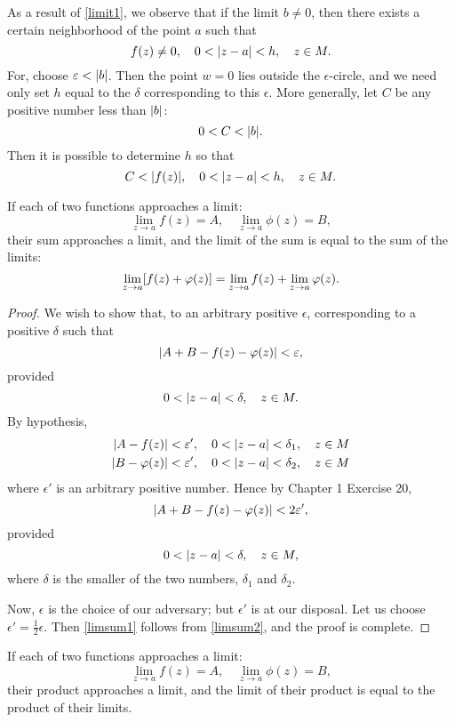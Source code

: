 \documentclass[twosided]{memoir}
\begin{document}
As a result of \ref{limit1}, we observe that if the limit $b\neq 0$, then there exists a certain neighborhood of the point $a$ such that
\[
	f(z)\neq 0, \quad 0<\abs*{z-a} <h, \quad z \in M
.\] For, choose $\epsilon<\abs*{b} $. Then the point $w=0$ lies outside the $\epsilon$-circle, and we need only set $h$ equal to the $\delta $ corresponding to this $\epsilon$. More generally, let $C$ be any positive number less than $\abs*{b} $:
\[
0<C<\abs*{b} 
.\] Then it is possible to determine $h$ so that
\[
	C<\abs*{f(z)} , \quad 0<\abs*{z-a} <h, \quad z \in M
.\] 
\begin{theorem}
If each of two functions approaches a limit:
\[
	\lim\limits_{z \to a} f(z)=A, \quad \lim\limits_{z \to a} \phi (z)=B
,\] their sum approaches a limit, and the limit of the sum is equal to the sum of the limits:
\[
	\lim\limits_{z \to a} \sbr*{f(z)+\phi (z)} =\lim\limits_{z \to a} f(z)+\lim\limits_{z \to a} \phi (z)
.\] 
\end{theorem} 

\begin{proof}
We wish to show that, to an arbitrary positive $\epsilon$, corresponding to a positive $\delta $ such that
\begin{equation}\label{limsum1}
	\abs*{A+B-f(z)-\phi (z)} <\epsilon,
\end{equation}
provided
\[
0<\abs*{z-a} <\delta , \quad z \in M
.\] By hypothesis,
\begin{align*}
	\abs*{A-f(z)} <\epsilon', \quad 0<\abs*{z-a} <\delta_1, \quad z \in M\\
	\abs*{B-\phi (z)} <\epsilon', \quad 0<\abs*{z-a} <\delta_2, \quad z \in M
\end{align*} where $\epsilon'$ is an arbitrary positive number. Hence by Chapter 1 Exercise 20,
\begin{equation}\label{limsum2}
	\abs*{A+B-f(z)-\phi (z)} <2\epsilon',
\end{equation}
provided
\[
0<\abs*{z-a} <\delta , \quad z \in M,
\] where $\delta $ is the smaller of the two numbers, $\delta_1$ and $\delta_2$. 

Now, $\epsilon$ is the choice of our adversary; but $\epsilon'$ is at our disposal. Let us choose $\epsilon'=\frac{1}{2}\epsilon$. Then \ref{limsum1} follows from \ref{limsum2}, and the proof is complete.
\end{proof} 

\begin{theorem}
If each of two functions approaches a limit:
\[
	\lim\limits_{z \to a} f(z)=A, \quad \lim\limits_{z \to a} \phi (z)=B
,\] their product approaches a limit, and the limit of their product is equal to the product of their limits. 
\end{theorem} 
\end{document}
